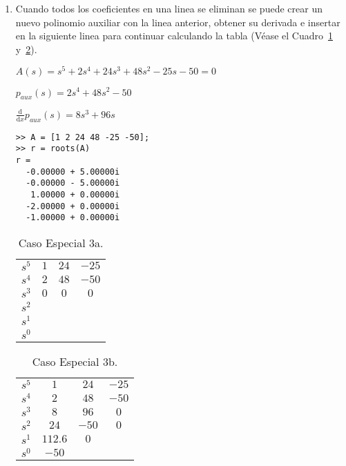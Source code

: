 \documentclass[12pt]{article}
\numberwithin{equation}{subsection}
\begin{document}
\begin{enumerate}
\item
Cuando todos los coeficientes en una linea se eliminan se puede crear un nuevo polinomio auxiliar con la linea anterior, obtener su derivada e insertar en la siguiente linea para continuar calculando la tabla (Véase el Cuadro~\ref{tab:Caso3a} y~\ref{tab:Caso3b}).

\begin{math}
A(s) = s^5 + 2 s^4 + 24 s^3 + 48 s^2 - 25 s - 50 = 0
\end{math}

\begin{math}
p_{aux}(s) = 2 s^4 + 48 s^2 - 50
\end{math}

\begin{math}
\frac{\mathrm d}{\mathrm d x} p_{aux}(s) = 8 s^3 + 96 s
\end{math}

\begin{verbatim}
>> A = [1 2 24 48 -25 -50];
>> r = roots(A)
r =
  -0.00000 + 5.00000i
  -0.00000 - 5.00000i
   1.00000 + 0.00000i
  -2.00000 + 0.00000i
  -1.00000 + 0.00000i
\end{verbatim}

\begin{table}[htbp]
\centering
\begin{tabular}{c|c c c}
$s^5$ & $1$ & $24$ & $-25$ \\
$s^4$ & $2$ & $48$ & $-50$ \\
$s^3$ & $0$ & $0$  & $0$   \\
$s^2$ \\
$s^1$ \\
$s^0$
\end{tabular}
\caption{\label{tab:Caso3a}Caso Especial 3a.}
\end{table}

\begin{table}[htbp]
\centering
\begin{tabular}{c|c c c}
$s^5$ & $1$ & $24$ & $-25$ \\
$s^4$ & $2$ & $48$ & $-50$ \\
$s^3$ & $8$ & $96$ & $0$   \\
$s^2$ & $24$ & $-50$ & $0$ \\
$s^1$ & $112.6$ & $0$ \\
$s^0$ & $-50$
\end{tabular}
\caption{\label{tab:Caso3b}Caso Especial 3b.}
\end{table}

\end{enumerate}
\end{document}
